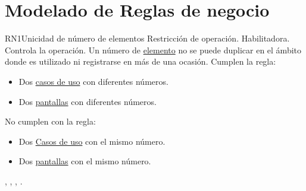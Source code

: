 \section{Modelado de Reglas de negocio}


\begin{BussinesRule}{RN1}{Unicidad de número de elementos}
	\BRitem[Tipo:] Restricción de operación. 
	\BRitem[Clase:] Habilitadora. 
	\BRitem[Nivel:] Controla la operación. %
	\BRitem[Descripción:] Un número de \hyperlink{tElemento}{elemento} no se puede duplicar en el ámbito donde es utilizado ni registrarse en más de una ocasión.
	 Cumplen la regla:
	\begin{itemize}
		\item Dos \hyperlink{casoUso}{casos de uso} con diferentes números.
		\item Dos \hyperlink{EntidadPantalla}{pantallas} con diferentes números.
	\end{itemize}
	 No cumplen con la regla:
	\begin{itemize}
		\item Dos \hyperlink{casoUso}{Casos de uso} con el mismo número.
		\item Dos \hyperlink{EntidadPantalla}{pantallas} con el mismo número.
	\end{itemize}
	 , , , .
\end{BussinesRule}

